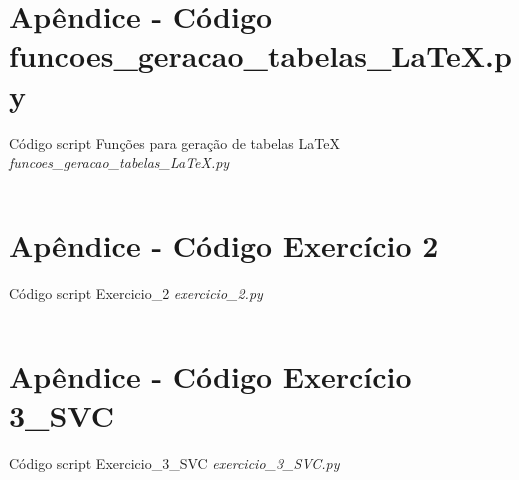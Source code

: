 




\renewcommand{\leftmark}{Apêndice - Código funcoes\_geracao\_tabelas\_LaTeX.py}
\section*{Apêndice - Código funcoes\_geracao\_tabelas\_LaTeX.py} \label{Apêndice - Código funcoes geracao tabelas LaTeX}

Código script Funções para geração de tabelas LaTeX \textit{funcoes\_geracao\_tabelas\_LaTeX.py}

\inputminted[linenos,framesep=1mm, baselinestretch=0.8,]{python}{Apendices/funcoes_geracao_tabelas_LaTeX.py}



\renewcommand{\leftmark}{Apêndice - Código Exercício 2}
\section*{Apêndice - Código Exercício 2} \label{Apêndice - Código Exercício 2}

Código script Exercicio\_2 \textit{exercicio\_2.py}

\inputminted[linenos,framesep=1mm, baselinestretch=0.8,]{python}{Apendices/exercicio_2.py}



\renewcommand{\leftmark}{Apêndice - Código Exercício 3\_SVC}
\section*{Apêndice - Código Exercício 3\_SVC} \label{Apêndice - Código Exercício 3 SVC}

Código script Exercicio\_3\_SVC \textit{exercicio\_3\_SVC.py}

